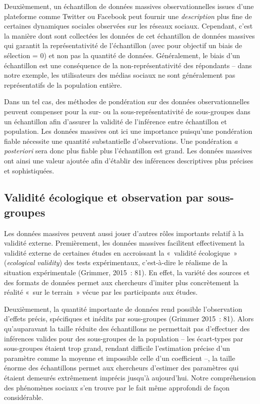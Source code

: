\documentclass[
  letterpaper,
]{scrbook}
\begin{document}
Deuxièmement, un échantillon de données massives observationnelles
issues d'une plateforme comme Twitter ou Facebook peut fournir une
\emph{description} plus fine de certaines dynamiques sociales observées
sur les réseaux sociaux. Cependant, c'est la manière dont sont
collectées les données de cet échantillon de données massives qui
garantit la représentativité de l'échantillon (avec pour objectif un
biais de sélection = 0) et non pas la quantité de données. Généralement,
le biais d'un échantillon est une conséquence de la non-représentativité
des répondants -- dans notre exemple, les utilisateurs des médias
sociaux ne sont généralement pas représentatifs de la population
entière.

Dans un tel cas, des méthodes de pondération sur des données
observationnelles peuvent compenser pour la sur- ou la
sous-représentativité de sous-groupes dans un échantillon afin d'assurer
la validité de l'inférence entre échantillon et population. Les données
massives ont ici une importance puisqu'une pondération fiable nécessite
une quantité substantielle d'observations. Une pondération \emph{a
posteriori} sera donc plus fiable plus l'échantillon est grand. Les
données massives ont ainsi une valeur ajoutée afin d'établir des
inférences descriptives plus précises et sophistiquées.

\hypertarget{validituxe9-uxe9cologique-et-observation-par-sous-groupes}{%
\subsection{Validité écologique et observation par
sous-groupes}\label{validituxe9-uxe9cologique-et-observation-par-sous-groupes}}

Les données massives peuvent aussi jouer d'autres rôles importants
relatif à la validité externe. Premièrement, les données massives
facilitent effectivement la validité externe de certaines études en
accroissant la «~validité écologique~» (\emph{ecological validity}) des
tests expérimentaux, c'est-à-dire le réalisme de la situation
expérimentale (Grimmer, 2015~: 81). En effet, la variété des sources et
des formats de données permet aux chercheurs d'imiter plus concrètement
la réalité «~sur le terrain~» vécue par les participants aux études.

Deuxièmement, la quantité importante de données rend possible
l'observation d'effets précis, spécifiques et inédits par sous-groupes
(Grimmer 2015~: 81). Alors qu'auparavant la taille réduite des
échantillons ne permettait pas d'effectuer des inférences valides pour
des sous-groupes de la population -- les écart-types par sous-groupes
étaient trop grand, rendant difficile l'estimation précise d'un
paramètre comme la moyenne et impossible celle d'un coefficient --, la
taille énorme des échantillons permet aux chercheurs d'estimer des
paramètres qui étaient demeurés extrêmement imprécis jusqu'à
aujourd'hui. Notre compréhension des phénomènes sociaux s'en trouve par
le fait même approfondi de façon considérable.
\end{document}
